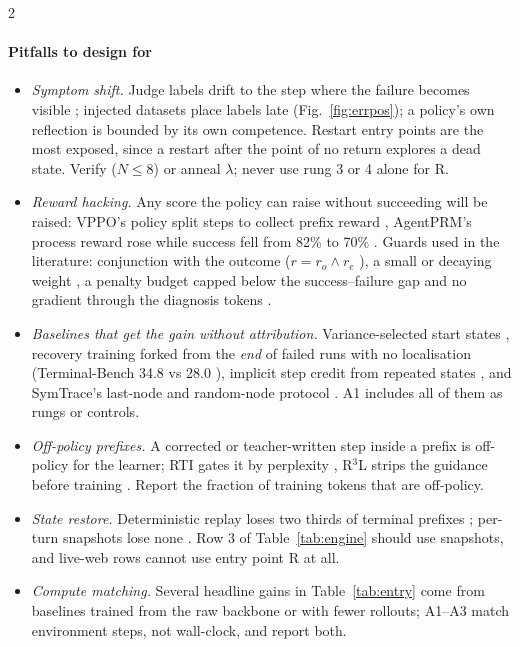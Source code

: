 \begin{multicols}{2}
\paragraph{Pitfalls to design for}
\begin{itemize}[leftmargin=1.1em]
\item \emph{Symptom shift.} Judge labels drift to the step where the failure becomes visible \cite{shen2026epv}; injected datasets place labels late (Fig.~\ref{fig:errpos}); a policy's own reflection is bounded by its own competence. Restart entry points are the most exposed, since a restart after the point of no return explores a dead state. Verify ($N\le8$) or anneal $\lambda$; never use rung 3 or 4 alone for R.
\item \emph{Reward hacking.} Any score the policy can raise without succeeding will be raised: VPPO's policy split steps to collect prefix reward \cite{liu2026vppo}, AgentPRM's process reward rose while success fell from 82\% to 70\% \cite{choudhury2025agentprm}. Guards used in the literature: conjunction with the outcome ($r=r_o\wedge r_e$ \cite{tian2026mirl}), a small or decaying weight \cite{agentevolver2025,zhao2026credithurts}, a penalty budget capped below the success--failure gap and no gradient through the diagnosis tokens \cite{zhu2026fault}.
\item \emph{Baselines that get the gain without attribution.} Variance-selected start states \cite{pivotrl2026}, recovery training forked from the \emph{end} of failed runs with no localisation (Terminal-Bench 34.8 vs 28.0 \cite{reterm2026}), implicit step credit from repeated states \cite{feng2025gigpo}, and SymTrace's last-node and random-node protocol \cite{luan2026symtrace}. A1 includes all of them as rungs or controls.
\item \emph{Off-policy prefixes.} A corrected or teacher-written step inside a prefix is off-policy for the learner; RTI gates it by perplexity \cite{chen2026rti}, R$^3$L strips the guidance before training \cite{shi2026r3l}. Report the fraction of training tokens that are off-policy.
\item \emph{State restore.} Deterministic replay loses two thirds of terminal prefixes \cite{tian2026mirl}; per-turn snapshots lose none \cite{liu2026sprout}. Row 3 of Table~\ref{tab:engine} should use snapshots, and live-web rows cannot use entry point R at all.
\item \emph{Compute matching.} Several headline gains in Table~\ref{tab:entry} come from baselines trained from the raw backbone or with fewer rollouts; A1--A3 match environment steps, not wall-clock, and report both.
\end{itemize}


\end{multicols}
